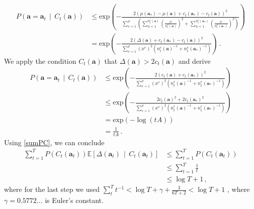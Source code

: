 \documentclass{article}
\newcommand{\prob}[1]{P\left( #1 \right)}
\newcommand{\md}{\,\middle|\,}
\begin{document}
\begin{align*}
\prob{ \mathbf{a} = \mathbf{a}_t \md C_t(\mathbf{a}) }
& \le \text{exp}\left( -\frac{ 2 ( \mu(\mathbf{a}_*) - \mu(\mathbf{a}) + c_t(\mathbf{a}_*) - c_t(\mathbf{a}) )^2 }{ \sum_{e=1}^\rho \left( \sum_{n=1}^{n^e_t(\mathbf{a})} \left( \frac{x^e}{n^e_t(\mathbf{a})} \right)^2 + \sum_{n=1}^{n^e_t(\mathbf{a}_*)} \left( \frac{x^e}{n^e_t(\mathbf{a}_*)} \right)^2 \right) } \right) \\
& = \text{exp}\left( -\frac{ 2 ( \Delta(\mathbf{a}) + c_t(\mathbf{a}_*) - c_t(\mathbf{a}) )^2 }{ \sum_{e=1}^\rho (x^e)^2 \left( n^e_t(\mathbf{a})^{-1} + n^e_t(\mathbf{a}_*)^{-1} \right) } \right) \,.
\end{align*}
We apply the condition $C_t(\mathbf{a})$ that $\Delta(\mathbf{a}) > 2 c_t(\mathbf{a})$ and derive
\begin{align*}
\prob{ \mathbf{a} = \mathbf{a}_t \md C_t(\mathbf{a}) }
& \le \text{exp}\left( -\frac{ 2 ( c_t(\mathbf{a}) + c_t(\mathbf{a}_*) )^2 }{ \sum_{e=1}^\rho (x^e)^2 \left( n^e_t(\mathbf{a})^{-1} + n^e_t(\mathbf{a}_*)^{-1} \right) } \right) \\
& \le \text{exp}\left( -\frac{ 2 c_t(\mathbf{a})^2 + 2 c_t(\mathbf{a}_*)^2 }{ \sum_{e=1}^\rho (x^e)^2 \left( n^e_t(\mathbf{a})^{-1} + n^e_t(\mathbf{a}_*)^{-1} \right) } \right) \\
& = \text{exp}\left( -\log( t A ) \right) \\
& = \frac{1}{t A} \,.
\end{align*}
Using \eqref{sumPC}, we can conclude
\begin{align}
\sum_{t=1}^T P( C_t(\mathbf{a}_t) ) \mathbb{E}\left[ \Delta(\mathbf{a}_t) \md C_t(\mathbf{a}_t) \right] 
& \le 
\sum_{t=1}^T P( C_t(\mathbf{a}_t) ) \nonumber\\
& \le
\sum_{t=1}^T \frac{1}{t} \nonumber\\
& \le
\log T + 1 \,, \label{C}
\end{align}
where for the last step we used $\sum_t^T t^{-1} < \log T + \gamma + \frac{3}{6T+2} < \log T + 1$ \citep{chen2003best}, where $\gamma = 0.5772\ldots$ is Euler's constant.
\end{document}
